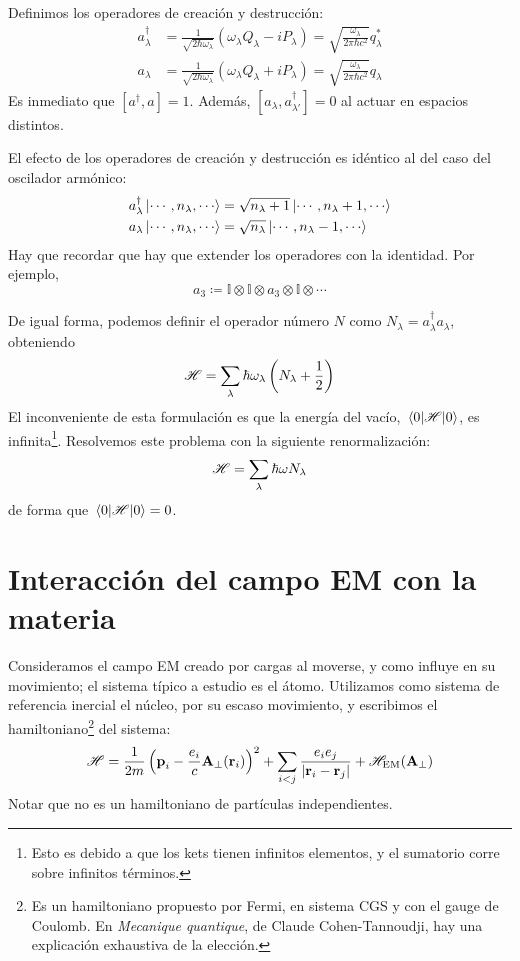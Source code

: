 Definimos los operadores de creación y destrucción:
\begin{align}
  a_\lambda^\dagger &= \frac{1}{\sqrt{2 \hbar\omega_\lambda}}
  (\omega_\lambda Q_\lambda - i P_\lambda) =
                      \sqrt{\frac{\omega_\lambda}{2\pi \hbar c^2}} q_\lambda^*\\
  a_\lambda&= \frac{1}{\sqrt{2 \hbar\omega_\lambda}}
  (\omega_\lambda Q_\lambda + i P_\lambda) =
                      \sqrt{\frac{\omega_\lambda}{2\pi \hbar c^2}} q_\lambda
\end{align}
Es inmediato que $[a^\dagger,a]=1$. Además,
$[a_\lambda,a_{\lambda'}^\dagger]=0$ al actuar en espacios distintos.

El efecto de los operadores de creación y destrucción es
idéntico al
del caso del oscilador armónico:
\begin{align}
  a_\lambda^\dagger \ket{\cdots,n_\lambda,\cdots} &=
                                                    \sqrt{n_\lambda+1}\ket{\cdots,n_\lambda+1,\cdots} \\
  a_\lambda \ket{\cdots,n_\lambda,\cdots} &= \sqrt{n_\lambda}\ket{\cdots,n_\lambda-1,\cdots}
\end{align}
Hay que recordar que hay que extender los operadores con la
  identidad. Por ejemplo,\[a_3 \coloneqq \mathbb{I}\otimes 
    \mathbb{I}\otimes a_3\otimes  \mathbb{I} \otimes \cdots \]

De igual forma, podemos definir el operador número $N$ como $N_\lambda
= a_\lambda^\dagger a_\lambda$, obteniendo
\begin{equation}
  \mathscr{H} = \sum_{\lambda} \hbar \omega_\lambda \left( N_\lambda + \frac{1}{2} \right)
\end{equation}
El inconveniente de esta formulación es que la energía del vacío,
$\ev{\Ham}{0}$, es infinita\footnote{Esto es debido a que los kets
  tienen infinitos elementos, y el sumatorio corre sobre infinitos
  términos.}. Resolvemos este problema con la siguiente
renormalización:
\begin{equation}
  \mathscr{H} = \sum_{\lambda} \hbar\omega N_\lambda
\end{equation}
de forma que $\ev{\Ham}{0}=0$.

\section{Interacción del campo EM con la materia}
Consideramos el campo EM creado por cargas al moverse, y como influye
en su movimiento; el sistema típico a estudio es el átomo. Utilizamos
como sistema de referencia inercial el núcleo, por su escaso
movimiento, y escribimos el hamiltoniano\footnote{Es un hamiltoniano
  propuesto por Fermi, en sistema CGS y con el gauge de Coulomb. En \emph{Mecanique quantique}, de Claude Cohen-Tannoudji, hay una explicación exhaustiva de la elección.} del sistema:
\begin{equation}
  \mathscr{H} = \frac{1}{2m} \left( \bm{\mathrm{p}}_i - \frac{e_i}{c}
    \bm{\mathrm{A}}_\perp (\bm{\mathrm{r}}_i) \right)^2 + \sum_{i<j}
  \frac{e_ie_j}{\abs{\bm{\mathrm{r}}_i - \bm{\mathrm{r}}_j}} + \mathscr{H}_\text{EM}(\bm{\mathrm{A}}_\perp)
  \label{eq:hamiltonrules}
\end{equation}
Notar que no es un hamiltoniano de partículas independientes. 

